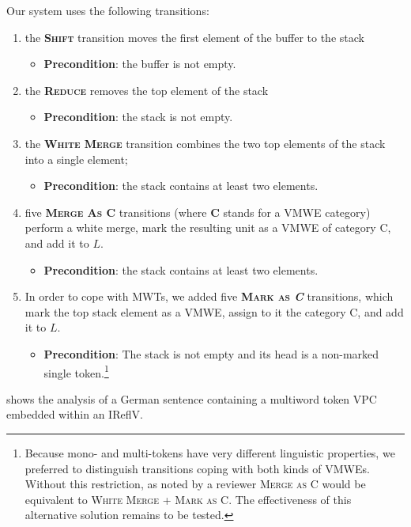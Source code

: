 \documentclass[output=paper,modfonts]{langscibook}
\begin{document}
Our system uses the following transitions: 
\begin{enumerate}
\item the \textsc{\textbf{Shift}} transition moves the first element of the buffer to the stack
\begin{itemize}
\item[] \textbf{Precondition}: the buffer is not empty.
\end{itemize}
\item the \textsc{\textbf{Reduce}} removes the top element of the stack
\begin{itemize}
\item[] \textbf{Precondition}: the stack is not empty.
\end{itemize}
\item the \textbf{\textsc{White Merge}} transition combines the two top elements of the stack into a single element;  
\begin{itemize}
\item[] \textbf{Precondition}: the stack contains at least two elements.
\end{itemize}
\item five \textsc{\textbf{Merge As \textbf{C}}} transitions (where \textbf{C} stands for a VMWE category) perform a white merge, mark the resulting unit as a VMWE of category \textsc{C}, and add it to $L$.
\begin{itemize}
\item[] \textbf{Precondition}: the stack contains at least two elements.
\end{itemize}
\item In order to cope with MWTs, we added five \textsc{\textbf{Mark as \emph{C}}} transitions, which mark the top stack element as a VMWE, assign to it the category \textsc{C}, and add it to $L$.
\begin{itemize}
\item[] \textbf{Precondition}: The stack is not empty and its head is a non-marked single token.\footnote{Because mono- and multi-tokens have very different linguistic properties, we preferred to distinguish transitions coping with both kinds of VMWEs. Without this restriction, as noted by a reviewer \textsc{Merge as C} would be equivalent to \textsc{White Merge + Mark as C}. The effectiveness of this alternative solution remains to be tested.}
\end{itemize}
\end{enumerate}
 shows the analysis of a German sentence containing a multiword token VPC embedded within an IReflV.
\end{document}
